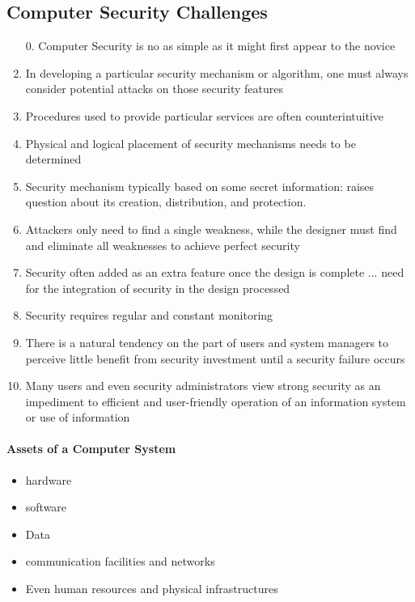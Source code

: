 \documentclass{article}
\begin{document}
    \subsection{Computer Security Challenges}
                 \begin{enumerate}
                    \item [$0.$]Computer Security is no as simple as it might first appear to  the novice
                    \item In developing a particular security mechanism or algorithm, one must always consider potential attacks on those security features
                    \item Procedures used to provide particular services are often counterintuitive
                    \item Physical and logical placement of security mechanisms needs to be determined
                    \item Security mechanism typically based on some secret information: raises question about its creation, distribution, and protection.
                    \item Attackers only need to find a single weakness, while the designer must find and eliminate all weaknesses to achieve perfect security
                    \item Security often added as an extra feature once the design is complete ... need for the integration of security  in the design processed
                    \item Security requires regular and constant monitoring
                    \item There is a natural tendency on the part of users and system managers to perceive little benefit from security investment until a security failure occurs
                    \item Many users and even security administrators view strong security as an impediment to efficient and user-friendly operation of an information system or use of information
                \end{enumerate}
            \paragraph{Assets of a Computer System}
                \begin{itemize}
                    \item hardware
                    \item software
                    \item Data
                    \item communication facilities and networks
                    \item Even human resources and physical infrastructures
                \end{itemize}
\end{document}
